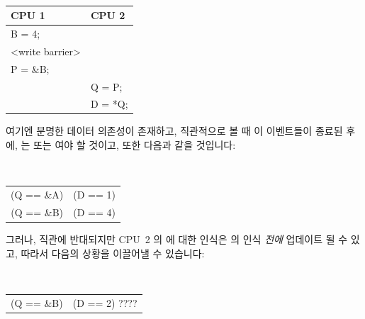 \begin{enumerate}
\vspace{5pt}
\begin{minipage}[t]{\columnwidth}
\tt
\scriptsize
\begin{tabular}{l|l}
	CPU 1 &		CPU 2 \\
	\hline
	B = 4; & \\
	<write barrier> & \\
	P = \&B; &	\\
		&	Q = P; \\
		&	D = *Q; \\
\end{tabular}
\end{minipage}
\vspace{5pt}

여기엔 분명한 데이터 의존성이 존재하고, 직관적으로 볼 때 이 이벤트들이 종료된
후에,  는  또는  여야 할 것이고, 또한 다음과 같을 것입니다:

\vspace{5pt}
\begin{minipage}[t]{\columnwidth}
\tt
\scriptsize
\begin{tabular}{c@{ implies }c}
	(Q == \&A) & (D == 1) \\
	(Q == \&B) & (D == 4) \\
\end{tabular}
\end{minipage}
\vspace{5pt}

그러나, 직관에 반대되지만 CPU~2 의  에 대한 인식은  의 인식
\emph{전에} 업데이트 될 수 있고, 따라서 다음의 상황을 이끌어낼 수 있습니다:

\vspace{5pt}
\begin{minipage}[t]{\columnwidth}
\tt
\scriptsize
\begin{tabular}{c@{ and }c}
	(Q == \&B) & (D == 2) ???? \\
\end{tabular}
\end{minipage}
\vspace{5pt}


\end{enumerate}
